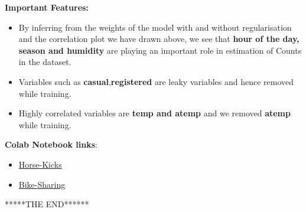 \documentclass[english,a4paper,12pt]{article}
\begin{document}
\begin{enumerate}
\textbullet\textbf{Important Features:}
\begin{itemize}
    \item By inferring from the weights of the model with and without regularisation and the correlation plot we have drawn above,  we see that \textbf{hour of the day, season and humidity} are playing an important role in estimation of Counts in the dataset.
    \item Variables such as \textbf{casual},\textbf{registered} are leaky variables and hence removed while training.
    \item Highly correlated variables are \textbf{temp and atemp} and we removed \textbf{atemp} while training.
\end{itemize}

 {\textbf{Colab Notebook links}}:
\begin{itemize}
    \item \href{https://colab.research.google.com/drive/1RIH4N19g8it21CmKt_tUkKTUPszNoOGc?usp=sharing}{Horse-Kicks}
    \item \href{https://colab.research.google.com/drive/13H5d6ahvjZSX75n3Lm-WQh5V6Pe4IM3P?usp=sharing}{Bike-Sharing}
\end{itemize}


\end{enumerate}
\vspace{2cm}
\center ******THE END******
\newpage    
\end{document}
